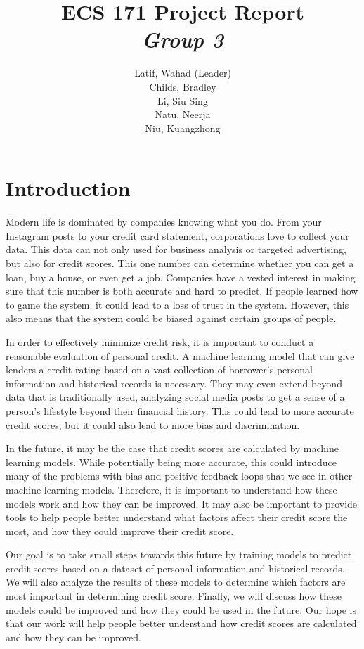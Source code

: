 \documentclass[12pt,twocolumn]{article}
\title{ECS 171 Project Report\\\textit{Group 3}}
\author{Latif, Wahad (Leader)\\ Childs, Bradley\\Li, Siu Sing\\Natu, Neerja\\Niu, Kuangzhong}
\begin{document}
\maketitle
\tableofcontents
\newpage
\section{Introduction}
Modern life is dominated by companies knowing what you do. From your Instagram posts to your credit card statement, corporations love to collect your data. This data can not only used for business analysis or targeted advertising, but also for credit scores. This one number can determine whether you can get a loan, buy a house, or even get a job. Companies have a vested interest in making sure that this number is both accurate and hard to predict. If people learned how to game the system, it could lead to a loss of trust in the system. However, this also means that the system could be biased against certain groups of people.

In order to effectively minimize credit risk, it is important to conduct a reasonable evaluation of personal credit. A machine learning model that can give lenders a credit rating based on a vast collection of borrower's personal information and historical records is necessary. They may even extend beyond data that is traditionally used, analyzing social media posts to get a sense of a person's lifestyle beyond their financial history. This could lead to more accurate credit scores, but it could also lead to more bias and discrimination.

In the future, it may be the case that credit scores are calculated  by machine learning models. While potentially being more accurate, this could introduce many of the problems with bias and positive feedback loops that we see in other machine learning models. Therefore, it is important to understand how these models work and how they can be improved. It may also be important to provide tools to help people better understand what factors affect their credit score the most, and how they could improve their credit score.

Our goal is to take small steps towards this future by training models to predict credit scores based on a dataset of personal information and historical records. We will also analyze the results of these models to determine which factors are most important in determining credit score. Finally, we will discuss how these models could be improved and how they could be used in the future. Our hope is that our work will help people better understand how credit scores are calculated and how they can be improved.
\end{document}
